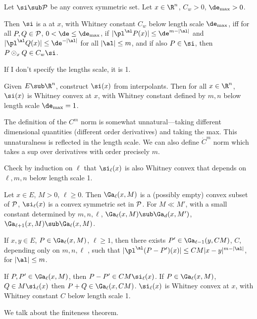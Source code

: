 \begin{df}
Let $\si\sub \cal P$ be any convex symmetric set. Let $x\in \R^n$, $C_w>0$, $\de_{\max}>0$. 

Then $\si$ is a  at $x$, with Whitney constant $C_w$ below length scale $\de_{\max}$, iff for all $P,Q\in \cal P$, $0<\de\le \de_{\max}$, if $|\pl^\al P(x)|\le \de^{m-|\al|}$ and $|\pl^\al Q(x)| \le \de^{-|\al|}$ for all $|\al|\le m$, and if also $P\in \si$, then $P\odot_x Q \in C_w\si$. 
\end{df}
If I don't specify the lengths scale, it is 1.
\begin{rem}
Given $E\sub \R^n$, construct $\si(x)$ from interpolants. Then for all $x\in \R^n$, $\si(x)$ is Whitney convex at $x$, with Whitney constant defined by $m,n$ below length scale $\de_{\max}=1$. 
\end{rem}
The definition of the $C^m$ norm is somewhat unnatural---taking different dimensional quantities (different order derivatives) and taking the max. This unnaturalness is reflected in the length scale. We can also define $\dot C^m$ norm which takes a sup over derivatives with order precisely $m$.%

Check by induction on $\ell$ that $\si_{\ell}(x)$ is also Whitney convex that depends on $\ell,m,n$ below length scale 1. 

Let $x\in E$, $M>0$, $\ell\ge 0$. Then $\Ga_\ell(x,M)$ is a (possibly empty) convex subset of $\cal P$, $\si_\ell(x)$ is a convex symmetric set in $\cal P$. For $M\ll M'$, with a small constant determined by $m,n,\ell$, $\Ga_\ell(x,M)\sub \Ga_d(x,M')$, $\Ga_{\ell+1}(x,M) \sub \Ga_\ell(x,M)$. 

If  $x,y\in E$, $P \in \Ga_\ell(x,M)$, $\ell\ge 1$, then there exists $P'\in \Ga_{\ell-1}(y,CM)$, $C$, depending only on $m,n,\ell$ , such that $|\pl^\al(P-P')(x)|\le CM|x-y|^{m-|\al|}$, for $|\al|\le m$. 

If $P,P'\in \Ga_\ell(x,M)$, then $P-P'\in CM\si_\ell(x)$. If $P\in \Ga_\ell(x,M)$, $Q\in M\si_\ell(x)$ then $P+Q\in \Ga_\ell(x,CM)$.
$\si_\ell(x)$ is Whitney convex at $x$, with Whitney constant $C$ below length scale 1.


We talk about the finiteness theorem. %

